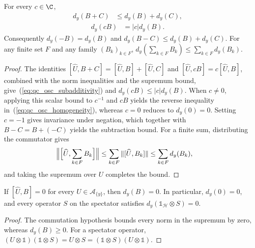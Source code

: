 \begin{lemma}
    \label{thm:qc_site_oscillation_seminorm}
    \leanok
    For every $c\in\C$,
    \begin{align}
        d_y(B+C) & \le d_y(B)+d_y(C),
        \label{eq:qc_osc_subadditivity}
    \end{align}
    \begin{align}
        d_y(cB) & =|c|d_y(B).
        \label{eq:qc_osc_homogeneity}
    \end{align}
    Consequently $d_y(-B)=d_y(B)$ and
    $d_y(B-C)\le d_y(B)+d_y(C)$.
    For any finite set $F$ and any family $(B_k)_{k\in F}$,
    $d_y(\sum_{k\in F}B_k)\le\sum_{k\in F}d_y(B_k)$.
\end{lemma}
\begin{proof}
    \leanok
    The identities
    $[\widehat U,B+C]=[\widehat U,B]+[\widehat U,C]$ and
    $[\widehat U,cB]=c[\widehat U,B]$, combined with the norm inequalities
    and the supremum bound, give~(\ref{eq:qc_osc_subadditivity}) and
    $d_y(cB)\le|c|d_y(B)$.
    When $c\ne0$, applying this scalar bound to $c^{-1}$ and $cB$ yields
    the reverse inequality in~(\ref{eq:qc_osc_homogeneity}), whereas $c=0$
    reduces to $d_y(0)=0$.
    Setting $c=-1$ gives invariance under negation, which together with
    $B-C=B+(-C)$ yields the subtraction bound.
    For a finite sum, distributing the commutator gives
    \begin{align}
        \Bigl\|\Bigl[\widehat U,\sum_{k\in F}B_k\Bigr]\Bigr\|
         & \le\sum_{k\in F}\|[\widehat U,B_k]\|
        \le\sum_{k\in F}d_y(B_k),
    \end{align}
    and taking the supremum over $U$ completes the bound.
\end{proof}

\begin{lemma}
    \label{thm:qc_site_oscillation_commutant}
    \leanok
    If $[\widehat U,B]=0$ for every $U\in\mathcal A_{\{y\}}$, then
    $d_y(B)=0$. In particular, $d_y(0)=0$, and every operator $S$ on
    the spectator satisfies $d_y(\mathbb 1_{\mathcal H}\otimes S)=0$.
\end{lemma}
\begin{proof}
    \leanok
    The commutation hypothesis bounds every norm in the supremum by
    zero, whereas $d_y(B)\ge0$. For a spectator operator,
    $(U\otimes\mathbb 1)(\mathbb 1\otimes S)=U\otimes S
        =(\mathbb 1\otimes S)(U\otimes\mathbb 1)$.
\end{proof}

